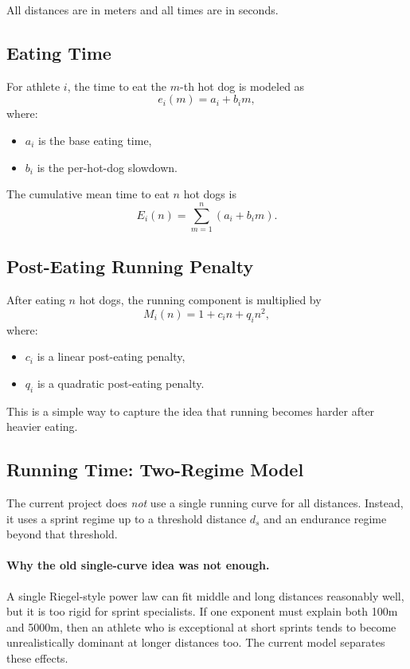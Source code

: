 \documentclass[11pt]{article}
\begin{document}
All distances are in meters and all times are in seconds.

\subsection*{Eating Time}

For athlete $i$, the time to eat the $m$-th hot dog is modeled as
\[
e_i(m) = a_i + b_i m,
\]
where:
\begin{itemize}
    \item $a_i$ is the base eating time,
    \item $b_i$ is the per-hot-dog slowdown.
\end{itemize}

The cumulative mean time to eat $n$ hot dogs is
\[
E_i(n) = \sum_{m=1}^{n} (a_i + b_i m).
\]

\subsection*{Post-Eating Running Penalty}

After eating $n$ hot dogs, the running component is multiplied by
\[
M_i(n) = 1 + c_i n + q_i n^2,
\]
where:
\begin{itemize}
    \item $c_i$ is a linear post-eating penalty,
    \item $q_i$ is a quadratic post-eating penalty.
\end{itemize}

This is a simple way to capture the idea that running becomes harder after heavier eating.

\subsection*{Running Time: Two-Regime Model}

The current project does \emph{not} use a single running curve for all distances.
Instead, it uses a sprint regime up to a threshold distance $d_s$ and an endurance regime beyond that threshold.

\paragraph{Why the old single-curve idea was not enough.}
A single Riegel-style power law can fit middle and long distances reasonably well, but it is too rigid for sprint specialists. If one exponent must explain both 100m and 5000m, then an athlete who is exceptional at short sprints tends to become unrealistically dominant at longer distances too. The current model separates these effects.
\end{document}
